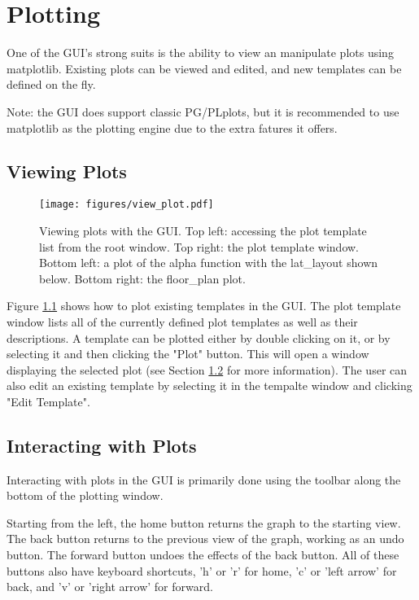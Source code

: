 \chapter{Plotting}
\label{s:gui.plot}

One of the GUI's strong suits is the ability to view an manipulate plots using matplotlib.
Existing plots can be viewed and edited, and new templates can be defined on the fly.

Note: the GUI does support classic PG/PLplots, but it is recommended to use matplotlib as the plotting engine due to the extra fatures it offers.

\section{Viewing Plots}
\label{s:gui.plot.view}

\begin{figure}
\centering
\texttt{[image: figures/view\_plot.pdf]}
\caption[Viewing plots with the GUI.]{Viewing plots with the GUI.
Top left: accessing the plot template list from the root window.
Top right: the plot template window.
Bottom left: a plot of the alpha function with the lat_layout shown below.
Bottom right: the floor_plan plot.}
\label{fig:gui.plot.view}
\end{figure}

Figure \ref{fig:gui.plot.view} shows how to plot existing templates in the GUI.
The plot template window lists all of the currently defined plot templates as well as their descriptions.
A template can be plotted either by double clicking on it, or by selecting it and then clicking the "Plot" button.
This will open a window displaying the selected plot (see Section \ref{s:gui.plot.interaction} for more information).
The user can also edit an existing template by selecting it in the tempalte window and clicking "Edit Template".

\section{Interacting with Plots}
\label{s:gui.plot.interaction}
Interacting with plots in the GUI is primarily done using the toolbar along the bottom of the plotting window.

Starting from the left, the home button returns the graph to the starting view. The back button returns to the previous view of the graph, working as an undo button. The forward button undoes the effects of the back button. All of these buttons also have keyboard shortcuts, 'h' or 'r' for home, 'c' or 'left arrow' for back, and 'v' or 'right arrow' for forward.

